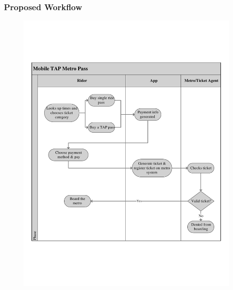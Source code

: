 	\subsubsection{Proposed Workflow}
		\begin{figure}[!htbp]
			\centering
			\includegraphics[width=\textwidth]{OCD/uml.pdf}
		\end{figure}
	